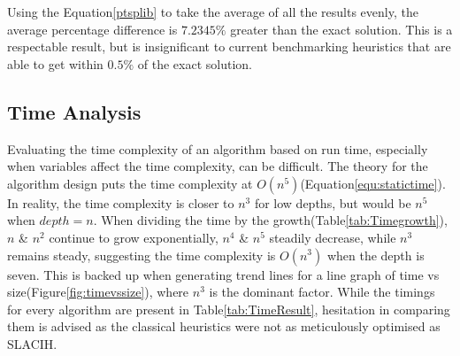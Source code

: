 Using the Equation\ref{ptsplib} to take the average of all the results evenly, the average percentage difference is $7.2345\%$ greater than the exact solution. This is a respectable result, but is insignificant to current benchmarking heuristics that are able to get within $0.5\%$ of the exact solution\cite{HELSGAUN2000106}.

\subsection{Time Analysis}

Evaluating the time complexity of an algorithm based on run time, especially when variables affect the time complexity, can be difficult. The theory for the algorithm design puts the time complexity at $O(n^5)$(Equation\ref{equ:statictime}). In reality, the time complexity is closer to $n^3$ for low depths, but would be $n^5$ when $depth = n$. When dividing the time by the growth(Table\ref{tab:Timegrowth}), $n$ \& $n^2$ continue to grow exponentially, $n^4$ \& $n^5$ steadily decrease, while $n^3$ remains steady, suggesting the time complexity is $O(n^3)$ when the depth is seven. This is backed up when generating trend lines for a line graph of time vs size(Figure\ref{fig:timevssize}), where $n^3$ is the dominant factor. While the timings for every algorithm are present in Table\ref{tab:TimeResult}, hesitation in comparing them is advised as the classical heuristics were not as meticulously optimised as SLACIH. 

